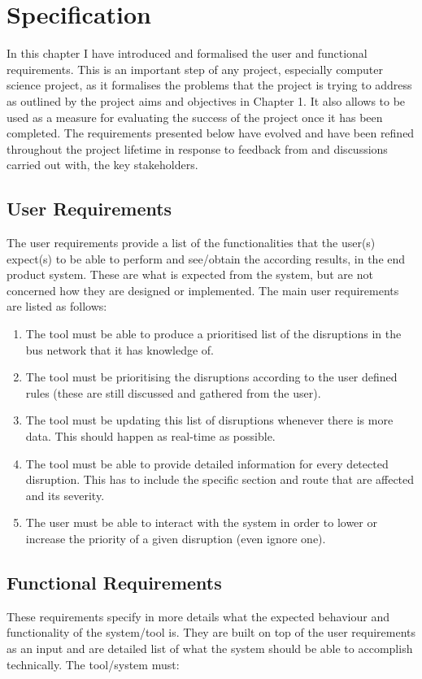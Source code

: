 \chapter{Specification}
In this chapter I have introduced and formalised the user and functional requirements.
This is an important step of any project, especially computer science project, as it formalises the problems that the project is trying to address as outlined by the project aims and objectives in Chapter 1. It also allows to be used as a measure for evaluating the success of the project once it has been completed. The requirements presented below have evolved and have been refined throughout the project lifetime in response to feedback from and discussions carried out with, the key stakeholders.

\section{User Requirements}
The user requirements provide a list of the functionalities that the user(s) expect(s) to be able to perform and see/obtain the according results, in the end product system. These are what is expected from the system, but are not concerned how they are designed or implemented. The main user requirements are listed as follows:

\begin{enumerate}
	\item The tool must be able to produce a prioritised list of the disruptions in
the bus network that it has knowledge of.
	\item The tool must be prioritising the disruptions according to the user defined
rules (these are still discussed and gathered from the user).
	\item The tool must be updating this list of disruptions whenever there is more
data. This should happen as real-time as possible.
	\item The tool must be able to provide detailed information for every detected disruption. This has to include the specific section and route that are affected and its severity.
	\item The user must be able to interact with the system in order to lower or
increase the priority of a given disruption (even ignore one).
\end{enumerate}

\section{Functional Requirements}
These requirements specify in more details what the expected behaviour and functionality of the system/tool is. They are built on top of the user requirements as an input and are detailed list of what the system should be able to accomplish technically. The tool/system must:

